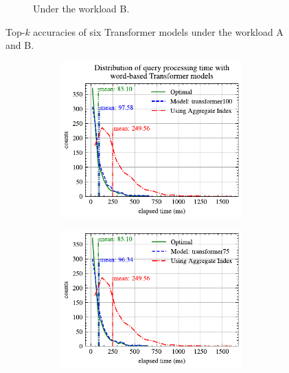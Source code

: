 \begin{figure}[!th]
\begin{subfigure}{0.45\textwidth}
		\caption{Under the workload B.}
		\label{fig:top_k_transformer_B}
	\end{subfigure}
	\caption{Top-$k$ accuracies of six Transformer models under the workload A and B.}
	\label{fig:top_k_transformer_all}
\end{figure}
\begin{figure}[p]
	\centering
	\begin{subfigure}{0.45\textwidth}
		\begin{subfigure}{\textwidth}
			\centering
			\includegraphics[]{my/graphics/perf_dist_transformer100_A.pdf}
		\end{subfigure}
		\vfill
		\begin{subfigure}{\textwidth}
			\centering
			\includegraphics[]{my/graphics/perf_dist_transformer75_A.pdf}

\end{subfigure}
\end{subfigure}
\end{figure}
